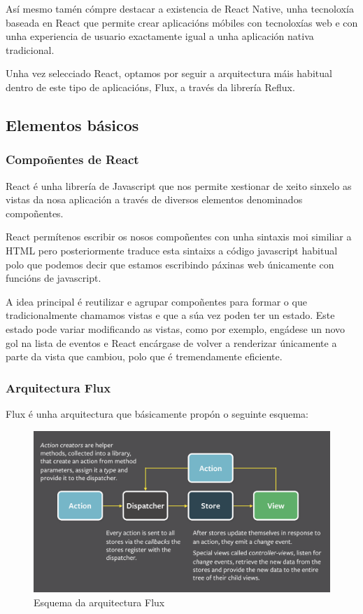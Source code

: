     Así mesmo tamén cómpre destacar a existencia de React Native, unha 
tecnoloxía baseada en React que permite crear aplicacións móbiles con 
tecnoloxías web e con unha experiencia de usuario exactamente igual a unha 
aplicación nativa tradicional.

    Unha vez selecciado React, optamos por seguir a arquitectura máis habitual 
dentro de este tipo de aplicacións, Flux, a través da librería Reflux.

    \subsection{Elementos básicos}
      \subsubsection{Compoñentes de React}
      React é unha librería de Javascript que nos permite xestionar de xeito 
sinxelo as vistas da nosa aplicación a través de diversos elementos denominados 
compoñentes.

      React permítenos escribir os nosos compoñentes con unha sintaxis moi 
similiar a HTML pero posteriormente traduce esta sintaixs a código javascript 
habitual polo que podemos decir que estamos escribindo páxinas web únicamente 
con funcións de javascript.

      A idea principal é reutilizar e agrupar compoñentes para formar o que 
tradicionalmente chamamos vistas e que a súa vez poden ter un estado.
      Este estado pode variar modificando as vistas, como por exemplo, 
engádese un novo gol na lista de eventos e React encárgase de volver a 
renderizar únicamente a parte da vista que cambiou, polo que é tremendamente 
eficiente.

      \subsubsection{Arquitectura Flux}
      Flux é unha arquitectura que básicamente propón o seguinte esquema:

        \begin{figure}[h!]
          \begin{center}
          \includegraphics[width=\textwidth]{./img/flux.png}
          \caption{Esquema da arquitectura Flux}
          \end{center}
        \end{figure}

